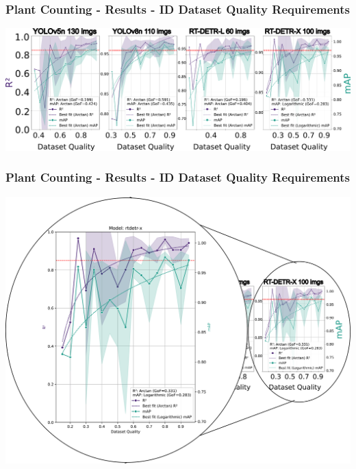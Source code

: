 \documentclass[aspectratio=43]{beamer}
\begin{document}
\begin{frame}
    \frametitle{\small Plant Counting - Results - ID Dataset Quality Requirements}
        
    \begin{center}
        \includegraphics[width=1\textwidth]{Imgs/r2_ap_vs_dataset_quality_2.pdf}
    \end{center}
\end{frame}
\begin{frame}
    \frametitle{\small Plant Counting - Results - ID Dataset Quality Requirements}
        
    \begin{center}
        \includegraphics[width=1\textwidth]{Imgs/r2_ap_vs_dataset_quality_3.pdf}
    \end{center}
\end{frame}
\end{document}
